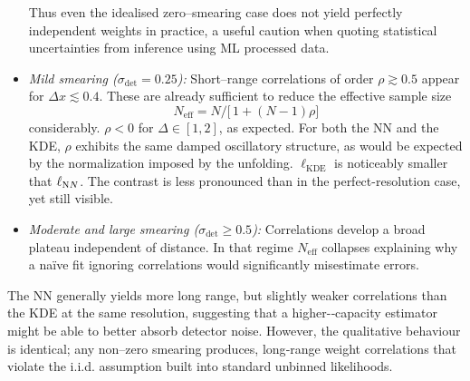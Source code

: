 \begin{itemize}
                Thus even the idealised zero--smearing case does not yield {perfectly} independent weights in practice, a useful caution when quoting statistical uncertainties from inference using ML processed data.
            \item \emph{Mild smearing (\(\sigma_{\det}=0.25\)):}
                Short--range correlations of order \(\rho\gtrsim 0.5\) appear for \(\Delta x\lesssim0.4\).
                These are already sufficient to reduce the {effective sample size}
                \[
                  N_{\text{eff}} = N/\!\bigl[\,1+(N-1)\rho\bigr]
                  \]
                   considerably.
                  \(\rho < 0\) for \(\Delta \in [1, 2]\), as expected.
                  For both the NN and the KDE, \(\rho\) exhibits the same damped oscillatory structure, as would be expected by the normalization imposed by the unfolding.
                  \(\ell_{\text{KDE}}\) is noticeably smaller that \(\ell_{\text NN}\).
                  The contrast is less pronounced than in the perfect-resolution case, yet still visible.
            \item \emph{Moderate and large smearing ($\sigma_{\det}\ge0.5$):}
                Correlations develop a broad plateau {independent of distance}.
                In that regime $N_\text{eff}$ collapses explaining why a naïve fit ignoring  correlations would significantly misestimate errors.
            \end{itemize}
            The \textsc{NN} generally yields more long range, but {slightly weaker} correlations than the \textsc{KDE} at the same resolution, suggesting that a higher-‐capacity estimator might be able to better absorb detector noise. 
            However, the qualitative behaviour is identical;
            any non–zero smearing produces, long‐range weight correlations that violate the i.i.d. assumption built into standard unbinned likelihoods.
